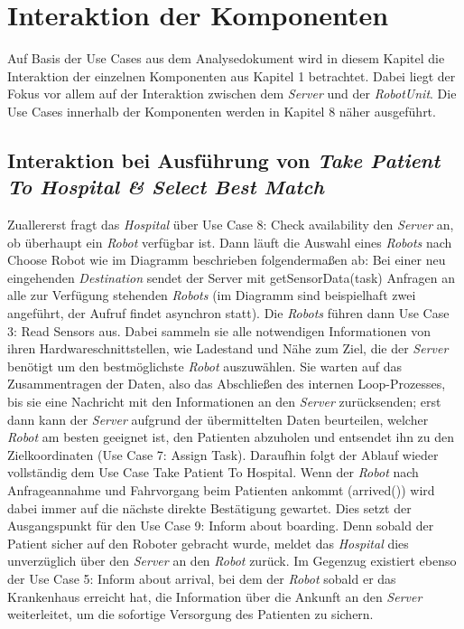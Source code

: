 \section{Interaktion der Komponenten}
Auf Basis der Use Cases aus dem Analysedokument wird in diesem Kapitel die Interaktion der einzelnen Komponenten aus Kapitel 1 betrachtet. Dabei liegt der Fokus vor allem auf der Interaktion zwischen dem \emph{Server} und der \emph{RobotUnit}. Die Use Cases innerhalb der Komponenten werden in Kapitel 8 näher ausgeführt. \\


\subsection*{Interaktion bei Ausführung von \emph{Take Patient To Hospital \& Select Best Match}}

Zuallererst fragt das \emph{Hospital} über Use Case 8: Check availability den \emph{Server} an, ob überhaupt ein \emph{Robot} verfügbar ist. Dann läuft die Auswahl eines \emph{Robots} nach Choose Robot wie im Diagramm beschrieben folgendermaßen ab: Bei einer neu eingehenden \emph{Destination} sendet der Server mit getSensorData(task) Anfragen an alle zur Verfügung stehenden \emph{Robots} (im Diagramm sind beispielhaft zwei angeführt, der Aufruf findet asynchron statt). Die \emph{Robots} führen dann Use Case 3: Read Sensors aus. Dabei sammeln sie alle notwendigen Informationen von ihren Hardwareschnittstellen, wie Ladestand und Nähe zum Ziel, die der \emph{Server} benötigt um den bestmöglichste \emph{Robot} auszuwählen. Sie warten auf das Zusammentragen der Daten, also das Abschließen des internen Loop-Prozesses, bis sie eine Nachricht mit den Informationen an den \emph{Server} zurücksenden; erst dann kann der \emph{Server} aufgrund der übermittelten Daten beurteilen, welcher \emph{Robot} am besten geeignet ist, den Patienten abzuholen und entsendet ihn zu den Zielkoordinaten (Use Case 7: Assign Task). Daraufhin folgt der Ablauf wieder vollständig dem Use Case Take Patient To Hospital. Wenn der \emph{Robot} nach Anfrageannahme und Fahrvorgang beim Patienten ankommt (arrived()) wird dabei immer auf die nächste direkte Bestätigung gewartet. Dies setzt der Ausgangspunkt für den Use Case 9: Inform about boarding. Denn sobald der Patient sicher auf den Roboter gebracht wurde, meldet das \emph{Hospital} dies unverzüglich über den \emph{Server} an den \emph{Robot} zurück. Im Gegenzug existiert ebenso der Use Case 5: Inform about arrival, bei dem der \emph{Robot} sobald er das Krankenhaus erreicht hat, die Information über die Ankunft an den \emph{Server} weiterleitet, um die sofortige Versorgung des Patienten zu sichern.

